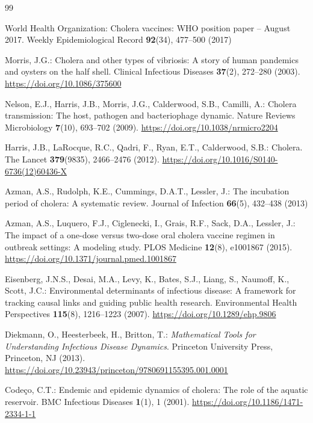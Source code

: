 \documentclass[11pt]{article}
\theoremstyle{plain}
\theoremstyle{definition}
\theoremstyle{remark}
\begin{document}
\begin{thebibliography}{99}

World Health Organization: Cholera vaccines: WHO position paper -- August 2017. Weekly Epidemiological Record \textbf{92}(34), 477--500 (2017)

Morris, J.G.: Cholera and other types of vibriosis: A story of human pandemics and oysters on the half shell. Clinical Infectious Diseases \textbf{37}(2), 272--280 (2003). \url{https://doi.org/10.1086/375600}

Nelson, E.J., Harris, J.B., Morris, J.G., Calderwood, S.B., Camilli, A.: Cholera transmission: The host, pathogen and bacteriophage dynamic. Nature Reviews Microbiology \textbf{7}(10), 693--702 (2009). \url{https://doi.org/10.1038/nrmicro2204}

Harris, J.B., LaRocque, R.C., Qadri, F., Ryan, E.T., Calderwood, S.B.: Cholera. The Lancet \textbf{379}(9835), 2466--2476 (2012). \url{https://doi.org/10.1016/S0140-6736(12)60436-X}

Azman, A.S., Rudolph, K.E., Cummings, D.A.T., Lessler, J.: The incubation period of cholera: A systematic review. Journal of Infection \textbf{66}(5), 432--438 (2013)

Azman, A.S., Luquero, F.J., Ciglenecki, I., Grais, R.F., Sack, D.A., Lessler, J.: The impact of a one-dose versus two-dose oral cholera vaccine regimen in outbreak settings: A modeling study. PLOS Medicine \textbf{12}(8), e1001867 (2015). \url{https://doi.org/10.1371/journal.pmed.1001867}

Eisenberg, J.N.S., Desai, M.A., Levy, K., Bates, S.J., Liang, S., Naumoff, K., Scott, J.C.: Environmental determinants of infectious disease: A framework for tracking causal links and guiding public health research. Environmental Health Perspectives \textbf{115}(8), 1216--1223 (2007). \url{https://doi.org/10.1289/ehp.9806}

Diekmann, O., Heesterbeek, H., Britton, T.: \textit{Mathematical Tools for Understanding Infectious Disease Dynamics}. Princeton University Press, Princeton, NJ (2013). \url{https://doi.org/10.23943/princeton/9780691155395.001.0001}

Code\c{c}o, C.T.: Endemic and epidemic dynamics of cholera: The role of the aquatic reservoir. BMC Infectious Diseases \textbf{1}(1), 1 (2001). \url{https://doi.org/10.1186/1471-2334-1-1}


\end{thebibliography}
\end{document}

